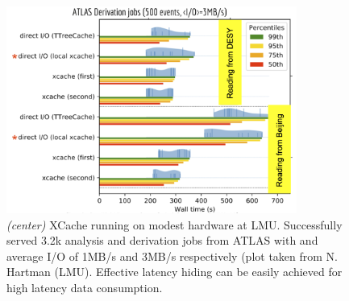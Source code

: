 \begin{figure}[h]
  \centering
  \includegraphics[height=6.8cm]{lmu.png}
  \caption{{\em (center)} XCache running on modest hardware at LMU. Successfully served 3.2k analysis and derivation jobs from ATLAS with and average I/O of 1MB/s and 3MB/s respectively (plot taken from N. Hartman (LMU). Effective latency hiding can be easily achieved for high latency data consumption.}
  \label{lmu-xcache}
\end{figure}




